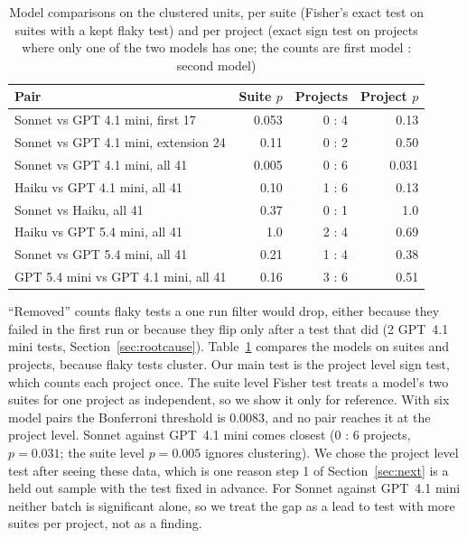 \documentclass[sigconf,nonacm]{acmart}
\begin{document}
\begin{table}[h]
\caption{Model comparisons on the clustered units, per suite (Fisher's exact test on suites with a kept flaky test) and per project (exact sign test on projects where only one of the two models has one; the counts are first model : second model)}
\label{tab:stats}
\small
\setlength{\tabcolsep}{3pt}
\begin{tabularx}{\columnwidth}{Xrrr}
\toprule
Pair & Suite $p$ & Projects & Project $p$ \\
\midrule
Sonnet vs GPT 4.1 mini, first 17 & 0.053 & 0 : 4 & 0.13 \\
Sonnet vs GPT 4.1 mini, extension 24 & 0.11 & 0 : 2 & 0.50 \\
Sonnet vs GPT 4.1 mini, all 41 & 0.005 & 0 : 6 & 0.031 \\
Haiku vs GPT 4.1 mini, all 41 & 0.10 & 1 : 6 & 0.13 \\
Sonnet vs Haiku, all 41 & 0.37 & 0 : 1 & 1.0 \\
Haiku vs GPT 5.4 mini, all 41 & 1.0 & 2 : 4 & 0.69 \\
Sonnet vs GPT 5.4 mini, all 41 & 0.21 & 1 : 4 & 0.38 \\
GPT 5.4 mini vs GPT 4.1 mini, all 41 & 0.16 & 3 : 6 & 0.51 \\
\bottomrule
\end{tabularx}
\end{table}

``Removed'' counts flaky tests a one run filter would drop, either because they failed in the first run or because they flip only after a test that did (2 GPT~4.1 mini tests, Section~\ref{sec:rootcause}). Table~\ref{tab:stats} compares the models on suites and projects, because flaky tests cluster. Our main test is the project level sign test, which counts each project once. The suite level Fisher test treats a model's two suites for one project as independent, so we show it only for reference. With six model pairs the Bonferroni threshold is 0.0083, and no pair reaches it at the project level. Sonnet against GPT~4.1 mini comes closest (0 : 6 projects, $p = 0.031$; the suite level $p = 0.005$ ignores clustering). We chose the project level test after seeing these data, which is one reason step 1 of Section~\ref{sec:next} is a held out sample with the test fixed in advance. For Sonnet against GPT~4.1 mini neither batch is significant alone, so we treat the gap as a lead to test with more suites per project, not as a finding.
\end{document}
